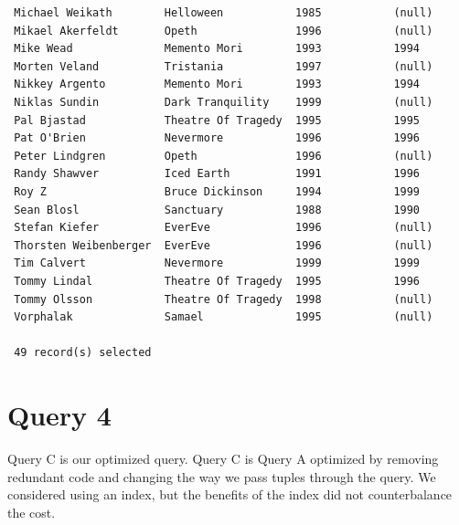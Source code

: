 \documentclass{report}
\begin{document}
\begin{verbatim}
 Michael Weikath        Helloween           1985           (null)      
 Mikael Akerfeldt       Opeth               1996           (null)      
 Mike Wead              Memento Mori        1993           1994        
 Morten Veland          Tristania           1997           (null)      
 Nikkey Argento         Memento Mori        1993           1994        
 Niklas Sundin          Dark Tranquility    1999           (null)      
 Pal Bjastad            Theatre Of Tragedy  1995           1995        
 Pat O'Brien            Nevermore           1996           1996        
 Peter Lindgren         Opeth               1996           (null)      
 Randy Shawver          Iced Earth          1991           1996        
 Roy Z                  Bruce Dickinson     1994           1999        
 Sean Blosl             Sanctuary           1988           1990        
 Stefan Kiefer          EverEve             1996           (null)      
 Thorsten Weibenberger  EverEve             1996           (null)      
 Tim Calvert            Nevermore           1999           1999        
 Tommy Lindal           Theatre Of Tragedy  1995           1996        
 Tommy Olsson           Theatre Of Tragedy  1998           (null)      
 Vorphalak              Samael              1995           (null)      

 49 record(s) selected
\end{verbatim}

\section*{Query 4}
Query C is our optimized query. Query C is Query A optimized by
removing redundant code and changing the way we pass tuples through
the query. We considered using an index, but the benefits of the index
did not counterbalance the cost.
\end{document}
